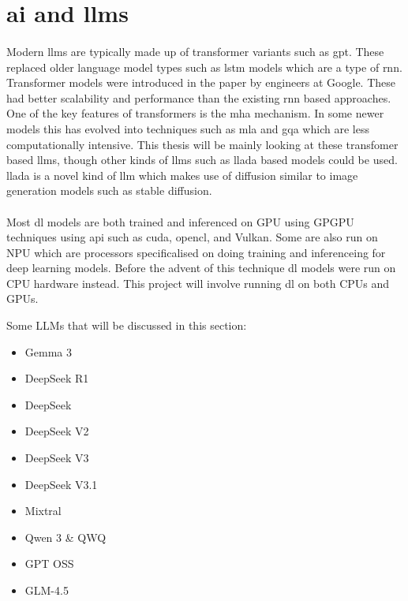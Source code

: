 \section{\acrlong{ai} and \acrlong{llm}s}

\paragraph{}Modern \acrshort{llm}s are typically made up of transformer variants such as \acrfull{gpt}. These replaced older language model types such as \acrfull{lstm} models which are a type of \acrfull{rnn}. Transformer models were introduced in the paper \textcite{vaswani_attention_2023} by engineers at Google. These had better scalability and performance than the existing \acrlong{rnn} based approaches. One of the key features of transformers is the \acrfull{mha} mechanism. In some newer models this has evolved into techniques such as \acrfull{mla} and \acrfull{gqa} which are less computationally intensive. This thesis will be mainly looking at these transfomer based \acrshort{llm}s, though other kinds of \acrshort{llm}s such as \acrfull{llada} based models could be used. \acrshort{llada} is a novel kind of \acrshort{llm} which makes use of diffusion similar to image generation models such as stable diffusion.

\paragraph{}Most \acrlong{dl} models are both trained and inferenced on \acrfull{GPU} using \acrfull{GPGPU} techniques using \acrfull{api} such as \acrfull{cuda}, \acrfull{opencl}, and Vulkan. Some are also run on \acrfull{NPU} which are processors specificalised on doing training and inferenceing for deep learning models. Before the advent of this technique \acrlong{dl} models were run on \acrfull{CPU} hardware instead. This project will involve running \acrlong{dl} on both \acrshort{CPU}s and \acrshort{GPU}s.

Some LLMs that will be discussed in this section:

\begin{itemize}
\item{Gemma 3}
\item{DeepSeek R1}
\item{DeepSeek}
\item{DeepSeek V2}
\item{DeepSeek V3}
\item{DeepSeek V3.1}
\item{Mixtral}
\item{Qwen 3 & QWQ}
\item{GPT OSS}
\item{GLM-4.5}
\end{itemize}

